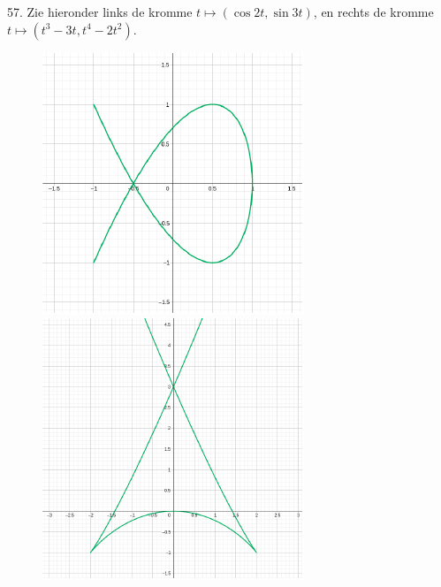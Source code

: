 \begin{problem}{57.}
	Zie hieronder links de kromme $t \mapsto (\cos 2t,\sin 3t)$, en rechts de kromme $t \mapsto (t^3 - 3 t,t^4 - 2 t^2)$.
    \begin{figure}
		\includegraphics{resources/oplossing57a}
		\includegraphics{resources/oplossing57b}
	\end{figure}
\end{problem}

